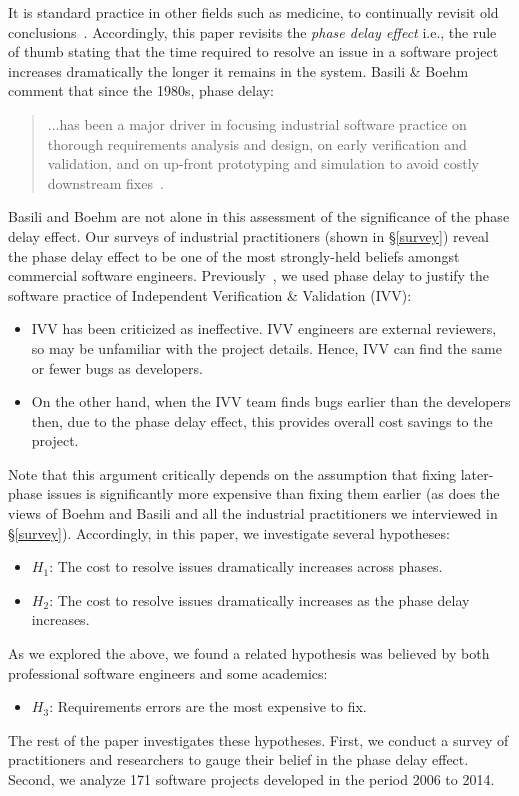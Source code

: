 \documentclass{sig-alternate}
\newcommand{\bi}{\begin{itemize}[leftmargin=0.4cm]}
\newcommand{\ei}{\end{itemize}}
\begin{document}
It is standard practice
in other fields such as medicine,
to continually revisit old conclusions~\cite{prasad13}.
Accordingly, this paper revisits
the {\em phase delay effect}
i.e.,  the rule of thumb stating that the time required to resolve an issue in a software project increases dramatically 
the longer it remains in the system. Basili \& Boehm comment that since the 1980s,  phase delay:
\begin{quote}
...has been a major driver in focusing
industrial software practice on thorough
requirements analysis and design,
on early verification and validation, and
on up-front prototyping and simulation
to avoid costly downstream fixes~\cite{boehm01}.
\end{quote}
Basili and Boehm are not alone in this assessment of the significance of the phase delay effect. Our surveys of industrial practitioners (shown in \S\ref{survey}) reveal the phase delay effect to be
one of the most strongly-held beliefs amongst commercial software engineers.
Previously~\cite{me08a}, we used phase delay to justify the software practice
of 
Independent Verification \& Validation (IVV):
\bi
\item
IVV has been criticized as
ineffective. IVV engineers are external reviewers, so may be unfamiliar with the project details.
Hence,    IVV   can find the same or fewer bugs
as  developers.
\item
On the other hand,   when the IVV team finds bugs earlier than the developers then, due to the phase delay effect, this provides overall cost savings to the project. 
\ei
Note that this argument critically depends on the assumption that   fixing later-phase issues is  significantly more expensive than fixing them earlier (as does the views of Boehm and Basili and all the industrial practitioners
we interviewed in \S\ref{survey}). Accordingly, in this paper, we investigate several hypotheses:
\bi
    \item $H_1$: The cost to resolve issues dramatically increases across phases.
    \item $H_2$: The cost to resolve issues dramatically increases as the phase delay increases.
\ei
As we explored the above, we found a related hypothesis was believed by both professional software engineers and some academics:
\bi
 \item $H_3$: Requirements errors are the most expensive to fix.
\ei
The rest of the paper investigates these  hypotheses. First, we conduct a survey of practitioners and researchers to gauge their belief in the phase delay effect. Second, we  analyze 171 software  projects developed in the period 2006 to 2014.  
\end{document}
